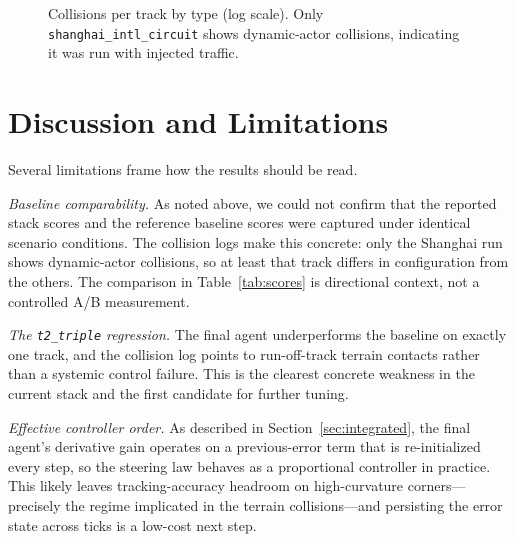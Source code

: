 \documentclass[conference]{IEEEtran}
\begin{document}
\begin{figure}[t]
\centering
{}
\caption{Collisions per track by type (log scale). Only
\texttt{shanghai\_intl\_circuit} shows dynamic-actor collisions, indicating it
was run with injected traffic.}
\label{fig:collisions}
\end{figure}

\section{Discussion and Limitations}
\label{sec:discussion}

Several limitations frame how the results should be read.

\emph{Baseline comparability.} As noted above, we could not confirm that the
reported stack scores and the reference baseline scores were captured under
identical scenario conditions. The collision logs make this concrete: only the
Shanghai run shows dynamic-actor collisions, so at least that track differs in
configuration from the others. The comparison in Table~\ref{tab:scores} is
directional context, not a controlled A/B measurement.

\emph{The \texttt{t2\_triple} regression.} The final agent underperforms the
baseline on exactly one track, and the collision log points to run-off-track
terrain contacts rather than a systemic control failure. This is the clearest
concrete weakness in the current stack and the first candidate for further
tuning.

\emph{Effective controller order.} As described in
Section~\ref{sec:integrated}, the final agent's derivative gain operates on a
previous-error term that is re-initialized every step, so the steering law
behaves as a proportional controller in practice. This likely leaves
tracking-accuracy headroom on high-curvature corners---precisely the regime
implicated in the terrain collisions---and persisting the error state across
ticks is a low-cost next step.
\end{document}
